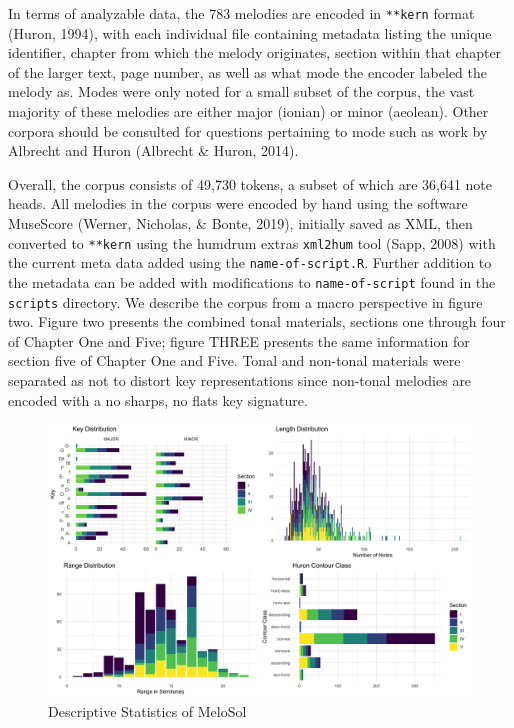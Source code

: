 \documentclass[english,man]{apa6}
\begin{document}
In terms of analyzable data, the 783 melodies are encoded in \texttt{**kern} format (Huron, 1994), with each individual file containing metadata listing the unique identifier, chapter from which the melody originates, section within that chapter of the larger text, page number, as well as what mode the encoder labeled the melody as.
Modes were only noted for a small subset of the corpus, the vast majority of these melodies are either major (ionian) or minor (aeolean).
Other corpora should be consulted for questions pertaining to mode such as work by Albrecht and Huron (Albrecht \& Huron, 2014).

Overall, the corpus consists of 49,730 tokens, a subset of which are 36,641 note heads.
All melodies in the corpus were encoded by hand using the software MuseScore (Werner, Nicholas, \& Bonte, 2019), initially saved as XML, then converted to \texttt{**kern} using the humdrum extras \texttt{xml2hum} tool (Sapp, 2008) with the current meta data added using the \texttt{name-of-script.R}.
Further addition to the metadata can be added with modifications to \texttt{name-of-script} found in the \texttt{scripts} directory.
We describe the corpus from a macro perspective in figure two.
Figure two presents the combined tonal materials, sections one through four of Chapter One and Five; figure THREE presents the same information for section five of Chapter One and Five.
Tonal and non-tonal materials were separated as not to distort key representations since non-tonal melodies are encoded with a no sharps, no flats key signature.

\begin{figure}
\centering
\includegraphics{../img/descriptive_panel.png}
\caption{Descriptive Statistics of MeloSol}
\end{figure}
\end{document}
